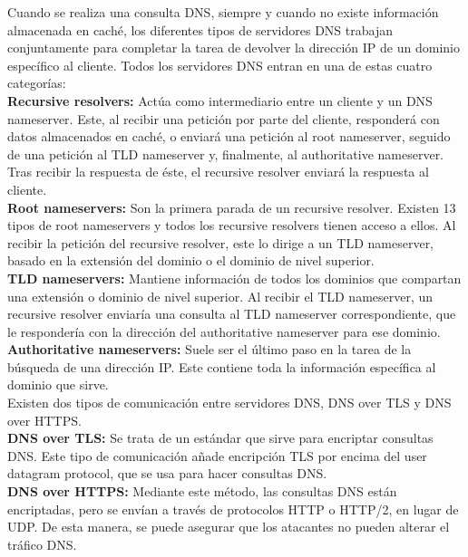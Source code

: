 \documentclass[spanish]{article}
\begin{document}
Cuando se realiza una consulta DNS, siempre y cuando no
existe información almacenada en caché, los diferentes
tipos de servidores DNS trabajan conjuntamente para
completar la tarea de devolver la dirección IP de un dominio
específico al cliente. Todos los servidores DNS entran en una de estas cuatro
categorías:\\

\textbf{Recursive resolvers:} Actúa como intermediario entre
un cliente y un DNS nameserver. Este, al recibir una
petición por parte del cliente, responderá con datos
almacenados en caché, o enviará una petición al root
nameserver, seguido de una petición al TLD nameserver y,
finalmente, al authoritative nameserver. Tras recibir la
respuesta de éste, el recursive resolver enviará la
respuesta al cliente.\\

\textbf{Root nameservers:} Son la primera parada de un
recursive resolver. Existen 13 tipos de root nameservers y todos los
recursive resolvers tienen acceso a ellos. Al recibir la
petición del recursive resolver, este lo dirige a un TLD
nameserver, basado en la extensión del dominio o el dominio
de nivel superior.\\

\textbf{TLD nameservers:} Mantiene información de todos los
dominios que compartan una extensión o dominio de nivel
superior. Al recibir el TLD nameserver, un recursive
resolver enviaría una consulta al TLD nameserver
correspondiente, que le respondería con la dirección del
authoritative nameserver para ese dominio.\\

\textbf{Authoritative nameservers:} Suele ser el último paso
en la tarea de la búsqueda de una dirección IP. Este
contiene toda la información específica al dominio que
sirve.\\

Existen dos tipos de comunicación entre servidores DNS, DNS
over TLS y DNS over HTTPS.\\

\textbf{DNS over TLS:} Se trata de un estándar que sirve
para encriptar consultas DNS. Este tipo de comunicación
añade encripción TLS por encima del user datagram protocol,
que se usa para hacer consultas DNS.\\

\textbf{DNS over HTTPS:} Mediante este método, las consultas
DNS están encriptadas, pero se envían a través de protocolos
HTTP o HTTP/2, en lugar de UDP. De esta manera, se puede
asegurar que los atacantes no pueden alterar el tráfico DNS.
\end{document}
